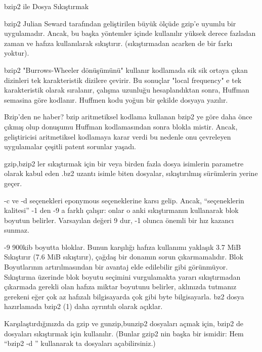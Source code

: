 \begin{section}{bzip2 ile Dosya Sıkıştırmak}

bzip2 Julian Seward tarafından geliştirilen büyük ölçüde gzip'e uyumlu bir uygulamadır. Ancak, bu başka yöntemler içinde kullanılır yüksek derece fazladan zaman ve hafıza kullanılarak sıkıştırır.  (sıkıştırmadan acarken de bir farkı yoktur).

bzip2 "Burrows-Wheeler dönüşümünü" kullanır kodlamada sik sik ortaya çıkan dizinleri tek karakteristik dizilere çevirir. Bu sonuçlar "local frequency" e tek karakteristik olarak sıralanır, çalışma uzunluğu hesaplandıktan sonra, Huffman semasina göre kodlanır. Huffmen kodu yoğun bir şekilde dosyaya yazılır.

Bzip'den ne haber? bzip aritmetiksel kodlama kullanan bzip2 ye göre daha önce çıkmış olup donuşumu Huffman kodlamasından sonra blokla mistir. Ancak, geliştiricisi aritmetiksel kodlamaya karar verdi bu nedenle onu çevreleyen uygulamalar çeşitli patent sorunlar yaşadı.

gzip,bzip2 ler sıkıştırmak için bir veya birden fazla dosya isimlerin parametre olarak kabul eden .bz2 uzantı isimle biten dosyalar, sıkıştırılmış sürümlerin yerine geçer.

-c ve -d seçenekleri eponymous seçeneklerine karsı gelip. Ancak, “seçeneklerin kalitesi” -1 den -9 a farklı çalışır: onlar o anki sıkıştırmanın kullanarak blok boyutun belirler. Varsayılan değeri 9 dur, -1 olunca önemli bir hız kazancı sunmaz.

-9 900kib boyutta bloklar. Bunun karşılığı hafıza kullanımı yaklaşık 3.7 MiB
Sıkıştırır (7.6 MiB sıkıştırır), çağdaş bir donamın sorun çıkarmamalıdır. Blok
Boyutlarının artırılmasından bir avantaj elde edilebilir gibi görünmüyor. Sıkıştırma üzerinde blok boyutu seçimini vurgulamakta yararı sıkıştırmadan çıkarmada gerekli olan hafıza miktar boyutunu belirler, aklınızda tutmanız gerekeni eğer çok az hafızalı bilgisayarda çok gibi byte bilgisayarla. bz2 dosya hazırlamada bzip2 (1) daha ayrıntılı olarak açıklar.

Karşılaştırdığınızda da gzip ve gunzip,bunzip2 dosyaları açmak için, bzip2 de dosyaları sıkıştırmak için kullanılır. (Bunlar gzip2 nin başka bir ismidir: Hem “bzip2 -d ” kullanarak ta dosyaları açabilirsiniz.)
\end{section}
